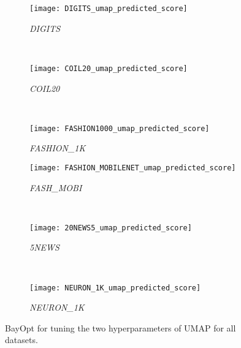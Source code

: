 \begin{figure*}%
    \begin{subfigure}[b]{.32\linewidth}
        \centering
        \texttt{[image: DIGITS\_umap\_predicted\_score]}
        \caption{\emph{DIGITS}}
        \label{fig:bo:umap:predict:DIGITS}
    \end{subfigure}
    ~
    \begin{subfigure}[b]{.32\linewidth}
        \centering
        \texttt{[image: COIL20\_umap\_predicted\_score]}
        \caption{\emph{COIL20}}
        \label{fig:bo:umap:predict:COIL20}
    \end{subfigure}
    ~
    \begin{subfigure}[b]{.32\linewidth}
        \centering
        \texttt{[image: FASHION1000\_umap\_predicted\_score]}
        \caption{\emph{FASHION\_1K}}
        \label{fig:bo:umap:predict:FASHION1K}
    \end{subfigure}
    \vfill
    \begin{subfigure}[b]{.32\linewidth}
        \centering
        \texttt{[image: FASHION\_MOBILENET\_umap\_predicted\_score]}
        \caption{\emph{FASH\_MOBI}}
        \label{fig:bo:umap:predict:FASHMOBI}
    \end{subfigure}
    ~
    \begin{subfigure}[b]{.32\linewidth}
        \centering
        \texttt{[image: 20NEWS5\_umap\_predicted\_score]}
        \caption{\emph{5NEWS}}
        \label{fig:bo:umap:predict:5NEWS}
    \end{subfigure}
    ~
    \begin{subfigure}[b]{.32\linewidth}
        \centering
        \texttt{[image: NEURON\_1K\_umap\_predicted\_score]}
        \caption{\emph{NEURON\_1K}}
        \label{fig:bo:umap:predict:NEURON1K}
    \end{subfigure}
    \caption{BayOpt for tuning the two hyperparameters of UMAP for all datasets.}
    \label{fig:bo:umap:predict}
\end{figure*}

